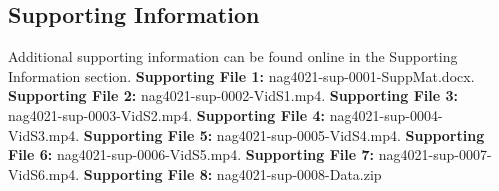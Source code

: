 \documentclass{article}
\begin{document}
\subsection*{Supporting Information}
Additional supporting information can be found online in the Supporting Information section.
\textbf{Supporting File 1:} nag4021-sup-0001-SuppMat.docx. \textbf{Supporting File 2:} nag4021-sup-0002-VidS1.mp4. \textbf{Supporting File 3:} nag4021-sup-0003-VidS2.mp4. \textbf{Supporting File 4:} nag4021-sup-0004-VidS3.mp4. \textbf{Supporting File 5:} nag4021-sup-0005-VidS4.mp4. \textbf{Supporting File 6:} nag4021-sup-0006-VidS5.mp4. \textbf{Supporting File 7:} nag4021-sup-0007-VidS6.mp4. \textbf{Supporting File 8:} nag4021-sup-0008-Data.zip
\end{document}
